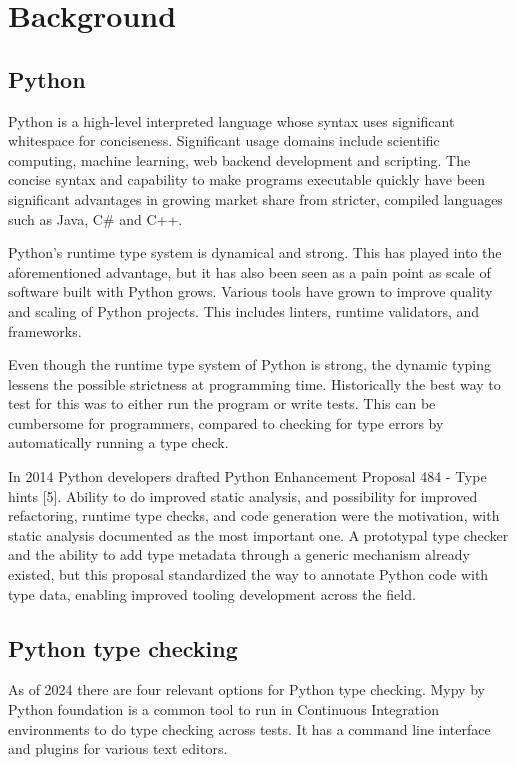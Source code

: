 \chapter{Background\label{background}}



\section{Python}
Python is a high-level interpreted language whose syntax uses significant whitespace for conciseness. Significant usage domains include scientific computing, machine learning, web backend development and scripting. The concise syntax and capability to make programs executable quickly have been significant advantages in growing market share from stricter, compiled languages such as Java, C\# and C++.

Python's runtime type system is dynamical and strong. This has played into the aforementioned advantage, but it has also been seen as a pain point as scale of software built with Python grows. Various tools have grown to improve quality and scaling of Python projects. This includes linters, runtime validators, and frameworks.

Even though the runtime type system of Python is strong, the dynamic typing lessens the possible strictness at programming time. Historically the best way to test for this was to either run the program or write tests. This can be cumbersome for programmers, compared to checking for type errors by automatically running a type check.

In 2014 Python developers drafted Python Enhancement Proposal 484 - Type hints [5]. Ability to do improved static analysis, and possibility for improved refactoring, runtime type checks, and code generation were the motivation, with static analysis documented as the most important one. A prototypal type checker and the ability to add type metadata through a generic mechanism already existed, but this proposal standardized the way to annotate Python code with type data, enabling improved tooling development across the field.


\section{Python type checking}
As of 2024 there are four relevant options for Python type checking. %
Mypy by Python foundation is a common tool to run in Continuous Integration environments to do type checking across tests. It has a command line interface and plugins for various text editors.

